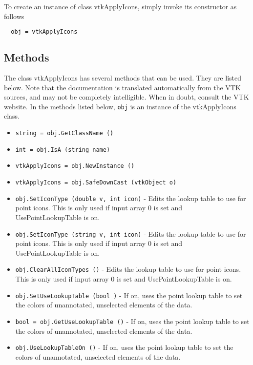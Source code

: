 To create an instance of class vtkApplyIcons, simply
invoke its constructor as follows
\begin{verbatim}
  obj = vtkApplyIcons
\end{verbatim}
\subsection{Methods}

The class vtkApplyIcons has several methods that can be used.
  They are listed below.
Note that the documentation is translated automatically from the VTK sources,
and may not be completely intelligible.  When in doubt, consult the VTK website.
In the methods listed below, \verb|obj| is an instance of the vtkApplyIcons class.
\begin{itemize}
\item  \verb|string = obj.GetClassName ()|

\item  \verb|int = obj.IsA (string name)|

\item  \verb|vtkApplyIcons = obj.NewInstance ()|

\item  \verb|vtkApplyIcons = obj.SafeDownCast (vtkObject o)|

\item  \verb|obj.SetIconType (double v, int icon)| -  Edits the lookup table to use for point icons. This is only used if
 input array 0 is set and UsePointLookupTable is on.

\item  \verb|obj.SetIconType (string v, int icon)| -  Edits the lookup table to use for point icons. This is only used if
 input array 0 is set and UsePointLookupTable is on.

\item  \verb|obj.ClearAllIconTypes ()| -  Edits the lookup table to use for point icons. This is only used if
 input array 0 is set and UsePointLookupTable is on.

\item  \verb|obj.SetUseLookupTable (bool )| -  If on, uses the point lookup table to set the colors of unannotated,
 unselected elements of the data.

\item  \verb|bool = obj.GetUseLookupTable ()| -  If on, uses the point lookup table to set the colors of unannotated,
 unselected elements of the data.

\item  \verb|obj.UseLookupTableOn ()| -  If on, uses the point lookup table to set the colors of unannotated,
 unselected elements of the data.


\end{itemize}
